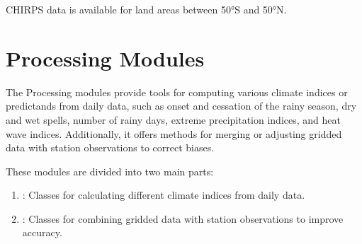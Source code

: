 \documentclass[letterpaper,10pt,english]{sphinxmanual}
\begin{document}
\sphinxAtStartPar
{} CHIRPS data is available for land areas between 50°S and 50°N.

\sphinxAtStartPar
{}

\begin{sphinxVerbatim}[commandchars=\\\{\}]
 

  
    \PYG{p}{[}\PYG{p}{]}
    \PYG{p}{[}   \PYG{p}{]}  
    \PYG{p}{[}  \PYG{p}{]}
\end{sphinxVerbatim}

\sphinxstepscope


\section{Processing Modules}
\label{\detokenize{Processing:processing-modules}}\label{\detokenize{Processing::doc}}
\sphinxAtStartPar
The Processing modules provide tools for computing various climate indices or predictands from daily data, such as onset and cessation of the rainy season, dry and wet spells, number of rainy days, extreme precipitation indices, and heat wave indices. Additionally, it offers methods for merging or adjusting gridded data with station observations to correct biases.

\sphinxAtStartPar
These modules are divided into two main parts:
\begin{enumerate}
%
\item {} 
\sphinxAtStartPar
{}: Classes for calculating different climate indices from daily data.

\item {} 
\sphinxAtStartPar
{}: Classes for combining gridded data with station observations to improve accuracy.

\end{enumerate}
\end{document}

